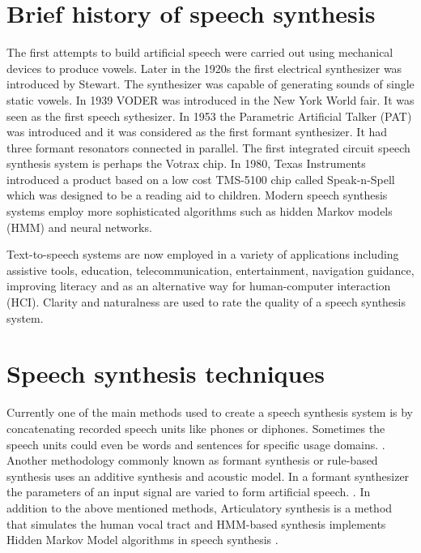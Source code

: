 \documentclass[11pt,a4paper,oneside,article]{memoir}
\begin{document}
\section{Brief history of speech synthesis}
The first attempts to build artificial speech were carried out using mechanical devices to produce vowels. Later in the 1920s the first electrical synthesizer was introduced by Stewart. The synthesizer was capable of generating sounds of single static vowels. In 1939 VODER was introduced in the New York World fair. It was seen as the first speech sythesizer.  In 1953 the Parametric Artificial Talker (PAT) was introduced and it was considered as the first formant synthesizer. It had three formant resonators connected in parallel. The first integrated circuit speech synthesis system is perhaps the Votrax chip. In 1980, Texas Instruments introduced a product based on a low cost TMS-5100 chip called Speak-n-Spell which was designed to be a reading aid to children. Modern speech synthesis systems employ more sophisticated algorithms such as hidden Markov models (HMM) and neural networks. \cite[4-10.]{hut}

Text-to-speech systems are now employed in a variety of applications including assistive tools, education, telecommunication, entertainment, navigation guidance, improving literacy \cite{rose2007plato} and as an alternative way for human-computer interaction (HCI). Clarity and naturalness are used to rate the quality of a speech synthesis system. \cite[79.]{hut}

\section{Speech synthesis techniques}
Currently one of the main methods used to create a speech synthesis system is by concatenating recorded speech units like phones or diphones.  Sometimes the speech units could even be words and sentences for specific usage domains. \cite{allen}. Another methodology commonly known as formant synthesis or rule-based synthesis uses an  additive synthesis and acoustic model. In a formant synthesizer the parameters of an input signal are varied to form  artificial speech. \cite{burk}. In addition to the above mentioned methods, Articulatory synthesis is a method that simulates the human vocal tract and HMM-based synthesis implements Hidden Markov Model algorithms in speech synthesis \cite{hut}.

\end{document}
